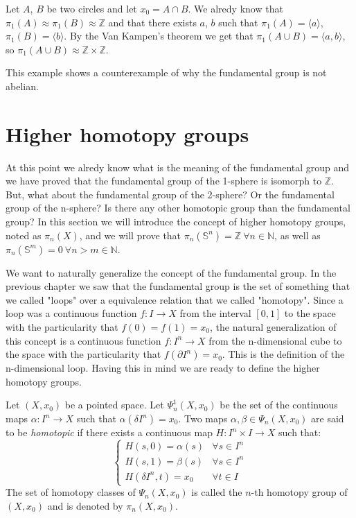 \documentclass[12pt]{article}
\begin{document}
\begin{example}
	Let \(A\), \(B\) be two circles and let \({x_0} = A \cap B\). We alredy know that \(\pi_1(A) \approx \pi_1(B) \approx \mathbb{Z}\) and that there exists \(a\), \(b\) such that \(\pi_1(A) = \langle a \rangle\), \(\pi_1(B) = \langle b \rangle\). By the Van Kampen's theorem we get that \(\pi_1(A \cup B) = \langle a, b \rangle\), so \(\pi_1(A \cup B) \approx \mathbb{Z} \times \mathbb{Z}\).
\end{example}

This example shows a counterexample of why the fundamental group is not abelian.


\section{Higher homotopy groups}

At this point we alredy know what is the meaning of the fundamental group and we have proved that the fundamental group of the 1-sphere is isomorph to \(\mathbb{Z}\). But, what about the fundamental group of the 2-sphere? Or the fundamental group of the n-sphere? Is there any other homotopic group than the fundamental group? In this section we will introduce the concept of higher homotopy groups, noted as \(\pi_n(X)\), and we will prove that \(\pi_n(\mathbb{S}^n) = \mathbb{Z} \ \forall n \in \mathbb{N}\), as well as \(\pi_n(\mathbb{S}^m) = 0 \ \forall n > m \in \mathbb{N}\).

We want to naturally generalize the concept of the fundamental group. In the previous chapter we saw that the fundamental group is the set of something that we called "loops" over a equivalence relation that we called "homotopy". Since a loop was a continuous function \(f : I \rightarrow X\) from the interval \([0,1]\) to the space with the particularity that \(f(0) = f(1) = x_0\), the natural generalization of this concept is a continuous function \(f : I^n \rightarrow X\) from the n-dimensional cube to the space with the particularity that \(f(\partial I^n) = x_0\). This is the definition of the n-dimensional loop. Having this in mind we are ready to define the higher homotopy groups.

\begin{definition}
	Let \((X, x_0)\) be a pointed space. Let \(\Psi_n^1(X, x_0)\) be the set of the continuous maps \(\alpha : I^n \rightarrow X\) such that \(\alpha(\delta I^n) = x_0\). Two maps \(\alpha, \beta \in \Psi_n(X, x_0)\) are said to be \textit{homotopic} if there exists a continuous map \(H : I^n \times I \rightarrow X\) such that:
	\[
		\begin{cases}
			H(s, 0) = \alpha(s) & \forall s \in I^n \\
			H(s, 1) = \beta(s) & \forall s \in I^n \\
			H(\delta I^n, t) = x_0 & \forall t \in I
		\end{cases}
	\]
	The set of homotopy classes of \(\Psi_n(X, x_0)\) is called the \(n\)-th homotopy group of \((X, x_0)\) and is denoted by \(\pi_n(X, x_0)\).
\end{definition}
\end{document}
